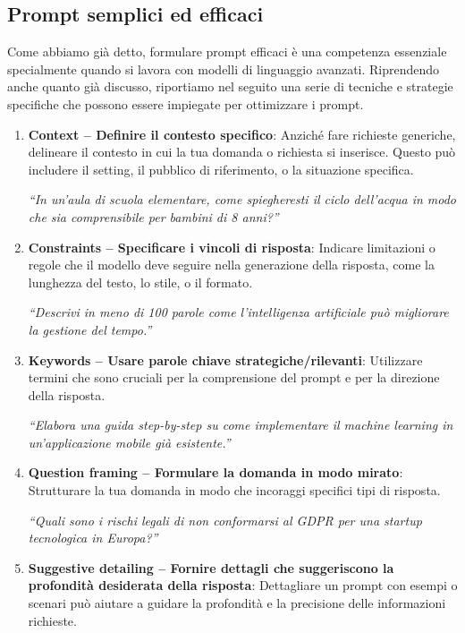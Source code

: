     \subsection{Prompt semplici ed efficaci}
        Come abbiamo già detto, formulare prompt efficaci è una competenza essenziale specialmente quando si lavora con modelli di linguaggio avanzati. Riprendendo anche quanto già discusso, riportiamo nel seguito una serie di tecniche e strategie specifiche che possono essere impiegate per ottimizzare i prompt.
        \begin{enumerate}
            \item \textbf{Context -- Definire il contesto specifico}: Anziché fare richieste generiche, delineare il contesto in cui la tua domanda o richiesta si inserisce. Questo può includere il setting, il pubblico di riferimento, o la situazione specifica.
            
            \textit{``In un'aula di scuola elementare, come spiegheresti il ciclo dell'acqua in modo che sia comprensibile per bambini di 8 anni?''}
            
            \item \textbf{Constraints -- Specificare i vincoli di risposta}: Indicare limitazioni o regole che il modello deve seguire nella generazione della risposta, come la lunghezza del testo, lo stile, o il formato.
            
            \textit{``Descrivi in meno di 100 parole come l'intelligenza artificiale può migliorare la gestione del tempo.''}
            
            \item \textbf{Keywords -- Usare parole chiave strategiche/rilevanti}: Utilizzare termini che sono cruciali per la comprensione del prompt e per la direzione della risposta.
            
            \textit{``Elabora una guida step-by-step su come implementare il machine learning in un'applicazione mobile già esistente.''}
            
            \item \textbf{Question framing -- Formulare la domanda in modo mirato}: Strutturare la tua domanda in modo che incoraggi specifici tipi di risposta.
            
            \textit{``Quali sono i rischi legali di non conformarsi al GDPR per una startup tecnologica in Europa?''}
            
            \item \textbf{Suggestive detailing -- Fornire dettagli che suggeriscono la profondità desiderata della risposta}: Dettagliare un prompt con esempi o scenari può aiutare a guidare la profondità e la precisione delle informazioni richieste.
            

\end{enumerate}
